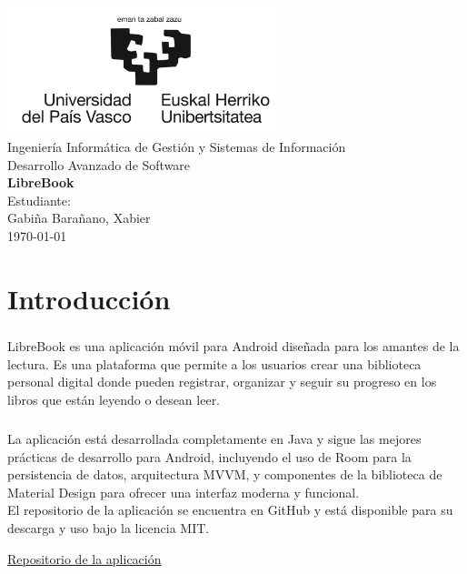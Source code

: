 \documentclass[a4paper,10pt]{report}
\begin{document}
  \begin{titlepage}
      \centering
      \includegraphics[width=0.6\textwidth]{./.img/logo.jpg}\\
      \vspace{1cm}
      \Large Ingeniería Informática de Gestión y Sistemas de Información\\
      \vspace{3cm}
      \Huge Desarrollo Avanzado de Software\\
      \vspace{0.5cm}
      \huge \textbf{LibreBook}\\
      \vspace{7.5cm}
      \Large Estudiante:\\
      \vspace{0.2cm}
      \large Gabiña Barañano, Xabier\\
      \vspace{1cm}
      \vfill
      \today
  \end{titlepage}
  \tableofcontents
  \listoffigures
  \chapter{Introducción}
    \paragraph*{}{
      LibreBook es una aplicación móvil para Android diseñada para los amantes de la lectura. Es una plataforma que permite a los usuarios crear una biblioteca personal digital donde pueden registrar, organizar y seguir su progreso en los libros que están leyendo o desean leer.
    }
    \paragraph*{}{
      La aplicación está desarrollada completamente en Java y sigue las mejores prácticas de desarrollo para Android, incluyendo el uso de Room para la persistencia de datos\cite{room_documentation}, arquitectura MVVM\cite{mvvm_pattern}, y componentes de la biblioteca de Material Design\cite{material_design} para ofrecer una interfaz moderna y funcional.\\
      El repositorio de la aplicación se encuentra en GitHub y está disponible para su descarga y uso bajo la licencia MIT.
    }
    \begin{center}
        \color{blue}\href{https://github.com/Xabierland/DAS-Proyecto}{Repositorio de la aplicación}
    \end{center}
\end{document}

